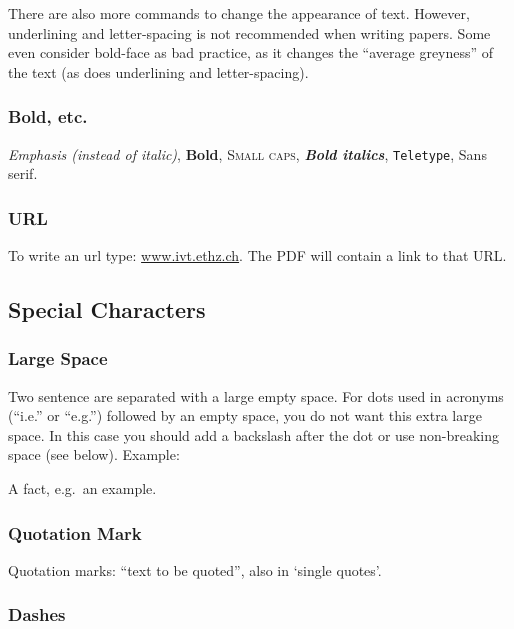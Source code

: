 There are also more commands to change the appearance of text.
However, underlining and letter-spacing
is not recommended when writing papers.
Some even consider bold-face as bad practice, as it changes
the ``average greyness'' of the text
(as does underlining and letter-spacing).

\subsubsection{Bold, etc.}

\emph{Emphasis (instead of italic)}, \textbf{Bold},
\textsc{Small caps}, \textbf{\textit{Bold italics}},
\texttt{Teletype}, \textsf{Sans serif}.

\subsubsection{URL}

To write an url type: \url{www.ivt.ethz.ch}.
The PDF will contain a link to that URL.

\subsection{Special Characters}

\subsubsection{Large Space}

Two sentence are separated with a large empty space. For dots used in
acronyms (``i.e.'' or ``e.g.'') followed by an empty space, you do not
want this extra large space. In this case you should add a backslash
after the dot
or use non-breaking space (see below).
Example:

A fact, e.g.\ an example.

\subsubsection{Quotation Mark}

Quotation marks: ``text to be quoted'', also in `single quotes'.

\subsubsection{Dashes}

